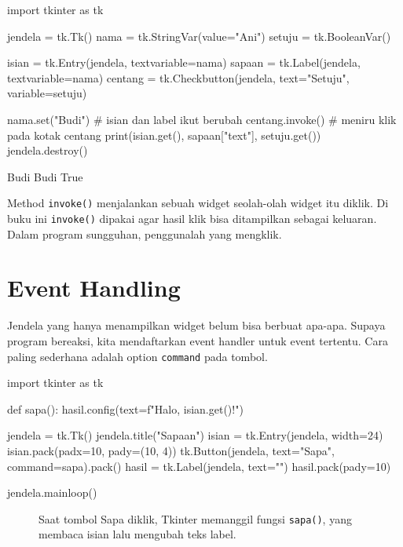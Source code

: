 \begin{kode}
import tkinter as tk

jendela = tk.Tk()
nama = tk.StringVar(value="Ani")
setuju = tk.BooleanVar()

isian = tk.Entry(jendela, textvariable=nama)
sapaan = tk.Label(jendela, textvariable=nama)
centang = tk.Checkbutton(jendela, text="Setuju", variable=setuju)

nama.set("Budi")                    # isian dan label ikut berubah
centang.invoke()                    # meniru klik pada kotak centang
print(isian.get(), sapaan["text"], setuju.get())
jendela.destroy()
\end{kode}

\begin{keluaran}
Budi Budi True
\end{keluaran}

Method \texttt{invoke()} menjalankan sebuah widget seolah-olah widget itu diklik. Di buku ini \texttt{invoke()} dipakai agar hasil klik bisa ditampilkan sebagai keluaran. Dalam program sungguhan, penggunalah yang mengklik.

\section{Event Handling}

Jendela yang hanya menampilkan widget belum bisa berbuat apa-apa. Supaya program bereaksi, kita mendaftarkan event handler untuk event tertentu. Cara paling sederhana adalah option \texttt{command} pada tombol.

\begin{kode}
import tkinter as tk

def sapa():
    hasil.config(text=f"Halo, {isian.get()}!")

jendela = tk.Tk()
jendela.title("Sapaan")
isian = tk.Entry(jendela, width=24)
isian.pack(padx=10, pady=(10, 4))
tk.Button(jendela, text="Sapa", command=sapa).pack()
hasil = tk.Label(jendela, text="")
hasil.pack(pady=10)

jendela.mainloop()
\end{kode}

\begin{figure}[htbp]
\centering
{}
\caption{Saat tombol Sapa diklik, Tkinter memanggil fungsi \texttt{sapa()}, yang membaca isian lalu mengubah teks label.}
\end{figure}

